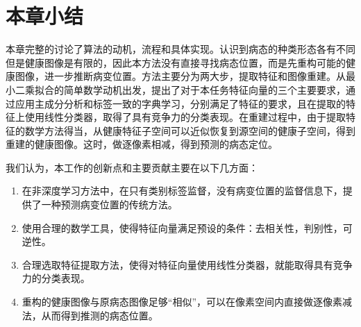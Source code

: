     \section{本章小结}
    本章完整的讨论了算法的动机，流程和具体实现。认识到病态的种类形态各有不同但是健康图像是有限的，因此本方法没有直接寻找病态位置，而是先重构可能的健康图像，进一步推断病变位置。方法主要分为两大步，提取特征和图像重建。从最小二乘拟合的简单数学动机出发，提出了对于本任务特征向量的三个主要要求，通过应用主成分分析和标签一致的字典学习，分别满足了特征的要求，且在提取的特征上使用线性分类器，取得了具有竞争力的分类表现。在重建过程中，由于提取特征的数学方法得当，从健康特征子空间可以近似恢复到源空间的健康子空间，得到重建的健康图像。这时，做逐像素相减，得到预测的病态定位。

    我们认为，本工作的创新点和主要贡献主要在以下几方面：
    \begin{enumerate}
        \item 在非深度学习方法中，在只有类别标签监督，没有病变位置的监督信息下，提供了一种预测病变位置的传统方法。
        \item 使用合理的数学工具，使得特征向量满足预设的条件：去相关性，判别性，可逆性。
        \item 合理选取特征提取方法，使得对特征向量使用线性分类器，就能取得具有竞争力的分类表现。
        \item 重构的健康图像与原病态图像足够“相似”，可以在像素空间内直接做逐像素减法，从而得到推测的病态位置。
    \end{enumerate}





